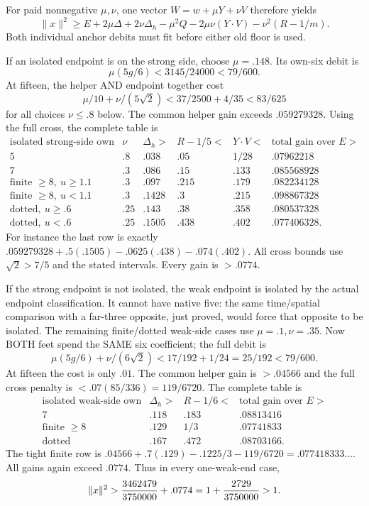 \documentclass[11pt]{article}
\theoremstyle{definition}
\theoremstyle{remark}
\begin{document}
For paid nonnegative \(\mu,\nu\),
one vector \(W=w+\mu Y+\nu V\)
therefore yields
\[
 \|x\|^2\ge E+2\mu\Delta+2\nu\Delta_h
           -\mu^2Q-2\mu\nu(Y\cdot V)-\nu^2(R-1/m).
\tag{A19joint}\label{app:exact19:eq:Ajoint}
\]
Both individual anchor debits must
fit before either old floor is used.

If an isolated endpoint is on the
strong side, choose \(\mu=.148\).
Its own-six debit is
\[
                       \mu(5g/6)<3145/24000<79/600 .
\]
At fifteen, the helper AND endpoint
together cost
\[
       \mu/10+\nu/(5\sqrt2)
              <37/2500+4/35<83/625
\]
for all choices \(\nu\le.8\) below.
The common helper gain exceeds
\(.059279328\).
Using the full cross, the complete
table is
\[
\begin{array}{c|c|c|c|c|c}
 \text{isolated strong-side own}&\nu&
 \Delta_h>&R-1/5<&Y\cdot V<&\text{total gain over }E>\\ \hline
 5&.8&.038&.05&1/28&.07962218\\
 7&.3&.086&.15&.133&.085568928\\
 \text{finite }\ge8,\ u\ge1.1&.3&.097&.215&.179&.082234128\\
 \text{finite }\ge8,\ u<1.1&.3&.1428&.3&.215&.098867328\\
 \text{dotted},\ u\ge.6&.25&.143&.38&.358&.080537328\\
 \text{dotted},\ u<.6&.25&.1505&.438&.402&.077406328 .
\end{array}
\]
For instance the last row is exactly
\(.059279328+.5(.1505)-.0625(.438)-.074(.402)\).
All cross bounds use \(\sqrt2>7/5\)
and the stated intervals.
Every gain is \(>.0774\).

If the strong endpoint is not
isolated, the weak endpoint is
isolated by the actual endpoint
classification.
It cannot have native five:
the same time/spatial comparison
with a far-three opposite, just
proved, would force that opposite
to be isolated.
The remaining finite/dotted
weak-side cases use
\(\mu=.1,\nu=.35\).
Now BOTH feet spend the SAME
six coefficient; the full debit is
\[
 \mu(5g/6)+\nu/(6\sqrt2)
                   <17/192+1/24=25/192<79/600 .
\]
At fifteen the cost is only \(.01\).
The common helper gain is \(>.04566\)
and the full cross penalty is
\(<.07(85/336)=119/6720\).
The complete table is
\[
\begin{array}{c|c|c|c}
 \text{isolated weak-side own}&\Delta_h>&R-1/6<&
                                    \text{total gain over }E>\\ \hline
 7&.118&.183&.08813416\\
 \text{finite }\ge8&.129&1/3&.07741833\\
 \text{dotted}&.167&.472&.08703166 .
\end{array}
\]
The tight finite row is
\(.04566+.7(.129)-.1225/3-119/6720
=.077418333\ldots\).
All gains again exceed \(.0774\).
Thus in every one-weak-end case,
\[
              \|x\|^2>{3462479\over3750000}+.0774
                       =1+{2729\over3750000}>1 .
\]
\end{document}
